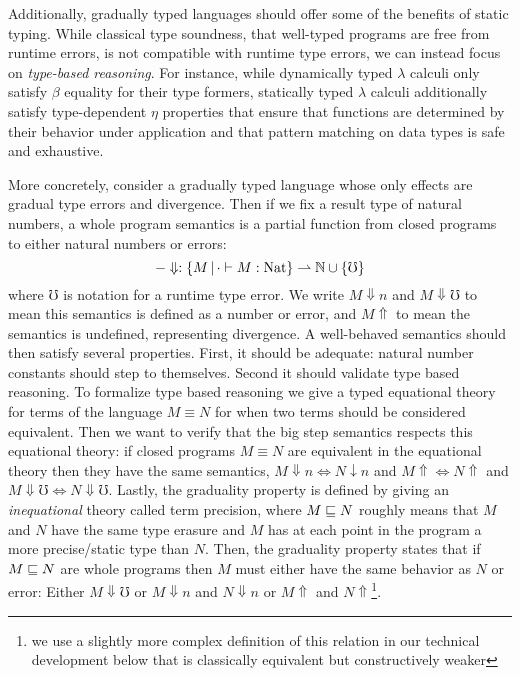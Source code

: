 Additionally, gradually typed languages should offer some of the
benefits of static typing. While classical type soundness, that
well-typed programs are free from runtime errors, is not compatible
with runtime type errors, we can instead focus on \emph{type-based
reasoning}. For instance, while dynamically typed $\lambda$ calculi
only satisfy $\beta$ equality for their type formers, statically typed
$\lambda$ calculi additionally satisfy type-dependent $\eta$
properties that ensure that functions are determined by their behavior
under application and that pattern matching on data types
is safe and exhaustive.

More concretely, consider a gradually typed language whose only
effects are gradual type errors and divergence. Then if we fix a
result type of natural numbers, a whole program semantics is a partial
function from closed programs to either natural numbers or errors:
\[ -\Downarrow : \{M \,|\, \cdot \vdash M : \text{Nat} \} \rightharpoonup \mathbb{N} \cup \{\mho\} \]
where $\mho$ is notation for a runtime type error. We write $M
\Downarrow n$ and $M\Downarrow \mho$ to mean this semantics is defined
as a number or error, and $M\Uparrow$ to mean the semantics is
undefined, representing divergence.
%
A well-behaved semantics should then satisfy several properties. First, it
should be adequate: natural number constants should step to
themselves. Second it should validate type based reasoning. To
formalize type based reasoning we give a typed equational theory for
terms of the language $M \equiv N$ for when two terms should be
considered equivalent. Then we want to verify that the big step
semantics respects this equational theory: if closed programs $M \equiv
N$ are equivalent in the equational theory then they have the same
semantics, $M \Downarrow n \iff N \downarrow n$ and $M\Uparrow \iff N
\Uparrow$ and $M \Downarrow \mho \iff N \Downarrow \mho$.
%
Lastly, the graduality property is defined by giving an
\emph{inequational} theory called term precision, where $M \sqsubseteq N$
roughly means that $M$ and $N$ have the same type erasure and $M$ has
at each point in the program a more precise/static type than $N$.
%
Then, the graduality property states that if $M \sqsubseteq N$ are whole
programs then $M$ must either have the same behavior as $N$ or error:
Either $M\Downarrow \mho$ or $M \Downarrow n $ and $N \Downarrow n$ or
$M \Uparrow $ and $N \Uparrow$\footnote{we use a slightly more complex
definition of this relation in our technical development below that is
classically equivalent but constructively weaker}.

